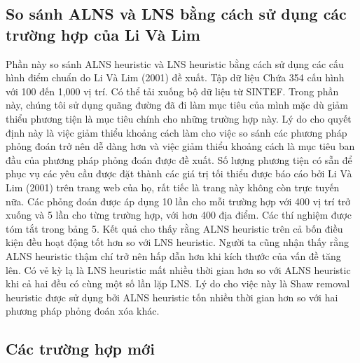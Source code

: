 \subsection{So sánh ALNS và LNS bằng cách sử dụng các trường hợp của Li Và Lim}
Phần này so sánh ALNS heuristic và LNS heuristic bằng cách sử dụng các cấu hình điểm chuẩn do Li Và Lim (2001) đề xuất. Tập dữ liệu Chứa 354 cấu hình với 100 đến 1,000 vị trí. Có thể tải xuống bộ dữ liệu từ SINTEF.
Trong phần này, chúng tôi sử dụng quãng đường đã đi làm mục tiêu của mình mặc dù giảm thiểu phương tiện là mục tiêu chính cho những trường hợp này. Lý do cho quyết định này là việc giảm thiểu khoảng cách làm cho việc so sánh các phương pháp phỏng đoán trở nên dễ dàng hơn và việc giảm thiểu khoảng cách là mục tiêu ban đầu của phương pháp phỏng đoán được đề xuất. Số lượng phương tiện có sẵn để phục vụ các yêu cầu được đặt thành các giá trị tối thiểu được báo cáo bởi Li Và Lim (2001) trên trang web của họ, rất tiếc là trang này không còn trực tuyến nữa. Các phỏng đoán được áp dụng 10 lần cho mỗi trường hợp với 400 vị trí trở xuống và 5 lần cho từng trường hợp, với hơn 400 địa điểm. Các thí nghiệm được tóm tắt trong bảng 5.
Kết quả cho thấy rằng ALNS heuristic trên cả bốn điều kiện đều hoạt động tốt hơn so với LNS heuristic. Người ta cũng nhận thấy rằng ALNS heuristic thậm chí trở nên hấp dẫn hơn khi kích thước của vấn đề tăng lên. Có vẻ kỳ lạ là LNS heuristic mất nhiều thời gian hơn so với ALNS heuristic khi cả hai đều có cùng một số lần lặp LNS. Lý do cho việc này là Shaw removal heuristic được sử dụng bởi ALNS heuristic tốn nhiều thời gian hơn so với hai phương pháp phỏng đoán xóa khác.

\subsection{Các trường hợp mới}

